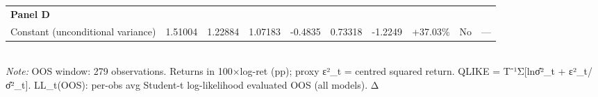 \begin{table}[ht]
\begin{tabular}{lrrrrrrrrr}
\multicolumn{10}{l}{\textbf{Panel D}} \\
Constant (unconditional variance) & 1.51004 & 1.22884 & 1.07183 & -0.4835 & 0.73318 & -1.2249 & +37.03\% & No & — \\
\bottomrule
\end{tabular}
\\[3pt]\footnotesize\textit{Note:} OOS window: 279 observations. Returns in 100×log-ret (pp); proxy ε²_t = centred squared return. QLIKE = T⁻¹Σ[lnσ̂²_t + ε²_t/σ̂²_t]. LL_t(OOS): per-obs avg Student-t log-likelihood evaluated OOS (all models). Δ%
\end{table}